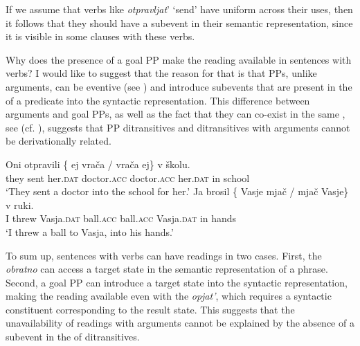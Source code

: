 \documentclass[output=paper]{langscibook}
\begin{document}
\noindent If we assume that  verbs like \textit{otpravljat}’ ‘send’ have uniform  across their uses, then it follows that they should have a  subevent in their semantic representation, since it is visible in some clauses with these verbs.

Why does the presence of a goal PP make the  reading available in sentences with  verbs? I would like to suggest that the reason for that is that PPs, unlike  arguments, can be eventive (see \citealt{McIntyre2006}) and introduce subevents that are present in the  of a predicate into the syntactic representation. This difference between  arguments and goal PPs, as well as the fact that they can co-exist in the same , see  (cf.  ), suggests that PP ditransitives and ditransitives with  arguments cannot be derivationally related.


 \ea\label{ex:bondarenko:25x}\ea\label{ex:bondarenko:25}
\gll Oni otpravili \{\hspace{-2pt} ej vrača / vrača ej\} v školu.\\
     they sent {} her.\textsc{dat} doctor.\textsc{acc} {} doctor.\textsc{acc} her.\textsc{dat} in school\\
\glt `They sent a doctor into the school for her.'
 \ex\label{ex:bondarenko:26}
\gll Ja brosil \{\hspace{-2pt} Vasje mjač / mjač Vasje\} v ruki.\\
     I threw {} Vasja.\textsc{dat} ball.\textsc{acc} {} ball.\textsc{acc} Vasja.\textsc{dat} in hands\\
\glt `I threw a ball to Vasja, into his hands.'
\z\z

 \ea\label{ex:bondarenko:27x}\label{ex:bondarenko:27}
\z\z


\noindent To sum up, sentences with   verbs can have  readings in two cases. First, the  \textit{obratno} can access a target state in the semantic representation of a  phrase. Second, a goal PP can introduce a target state into the syntactic representation, making the  reading available even with the   \textit{opjat’}, which requires a syntactic constituent corresponding to the result state. This suggests that the unavailability of  readings with  arguments cannot be explained by the absence of a  subevent in the  of  ditransitives.
\end{document}
